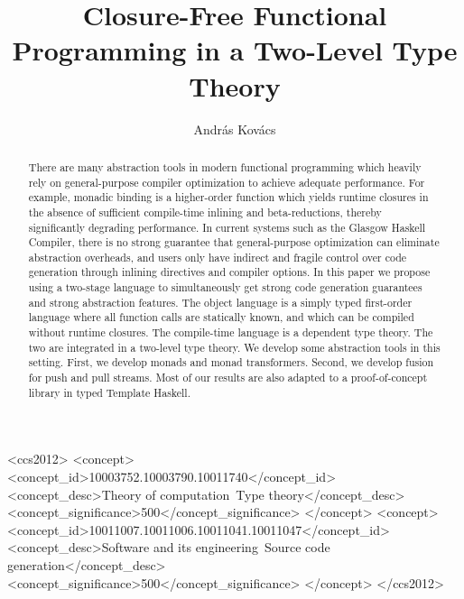 \documentclass[acmsmall,screen,review,anonymous]{acmart}
\begin{document}
\title{Closure-Free Functional Programming in a Two-Level Type Theory}

\author{András Kovács}

\begin{abstract}
There are many abstraction tools in modern functional programming which heavily
rely on general-purpose compiler optimization to achieve adequate
performance. For example, monadic binding is a higher-order function which
yields runtime closures in the absence of sufficient compile-time inlining and
beta-reductions, thereby significantly degrading performance. In current systems
such as the Glasgow Haskell Compiler, there is no strong guarantee that
general-purpose optimization can eliminate abstraction overheads, and users only
have indirect and fragile control over code generation through inlining
directives and compiler options. In this paper we propose using a two-stage
language to simultaneously get strong code generation guarantees and strong
abstraction features. The object language is a simply typed first-order language
where all function calls are statically known, and which can be compiled without
runtime closures. The compile-time language is a dependent type theory. The two
are integrated in a two-level type theory. We develop some abstraction
tools in this setting. First, we develop monads and monad transformers. Second,
we develop fusion for push and pull streams. Most of our results are also
adapted to a proof-of-concept library in typed Template Haskell.
\end{abstract}

\begin{CCSXML}
<ccs2012>
   <concept>
       <concept_id>10003752.10003790.10011740</concept_id>
       <concept_desc>Theory of computation~Type theory</concept_desc>
       <concept_significance>500</concept_significance>
       </concept>
   <concept>
       <concept_id>10011007.10011006.10011041.10011047</concept_id>
       <concept_desc>Software and its engineering~Source code generation</concept_desc>
       <concept_significance>500</concept_significance>
       </concept>
 </ccs2012>
\end{CCSXML}
\end{document}
